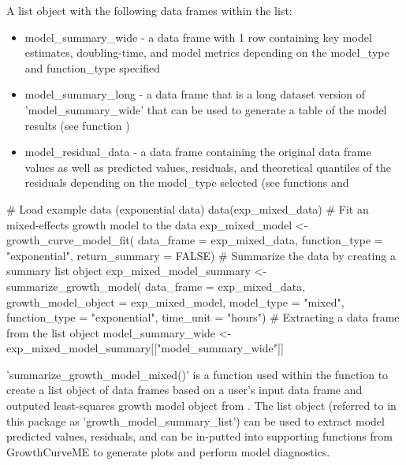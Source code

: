 \documentclass[a4paper]{book}
\begin{document}
\begin{Value}
A list object with the following data frames within the list:
\begin{itemize}

\item{} model\_summary\_wide - a data frame with 1 row containing
key model estimates, doubling-time, and model metrics depending
on the model\_type and function\_type specified
\item{} model\_summary\_long - a data frame that is a long dataset version of
'model\_summary\_wide' that can be used to generate a table of the model
results (see function )
\item{} model\_residual\_data - a data frame containing the original data
frame values as well as predicted values, residuals, and theoretical
quantiles of the residuals depending on the model\_type selected
(see functions  and

\end{itemize}

\end{Value}
%
\begin{SeeAlso}
\end{SeeAlso}
%
\begin{Examples}
\begin{ExampleCode}
# Load example data (exponential data)
data(exp_mixed_data)
# Fit an mixed-effects growth model to the data
exp_mixed_model <- growth_curve_model_fit(
data_frame = exp_mixed_data,
function_type = "exponential",
return_summary = FALSE)
# Summarize the data by creating a summary list object
exp_mixed_model_summary <- summarize_growth_model(
data_frame = exp_mixed_data,
growth_model_object = exp_mixed_model,
model_type = "mixed",
function_type = "exponential",
time_unit = "hours")
# Extracting a data frame from the list object
model_summary_wide <- exp_mixed_model_summary[["model_summary_wide"]]
\end{ExampleCode}
\end{Examples}
%
\begin{Description}
'summarize\_growth\_model\_mixed()' is a function used within the
 function to create a list object of
data frames based on a user's input data frame and outputed least-squares
growth model object from .
The list object (referred to in this package as 'growth\_model\_summary\_list')
can be used to extract model predicted values, residuals,
and can be in-putted into supporting functions from GrowthCurveME to
generate plots and perform model diagnostics.
\end{Description}
\end{document}
